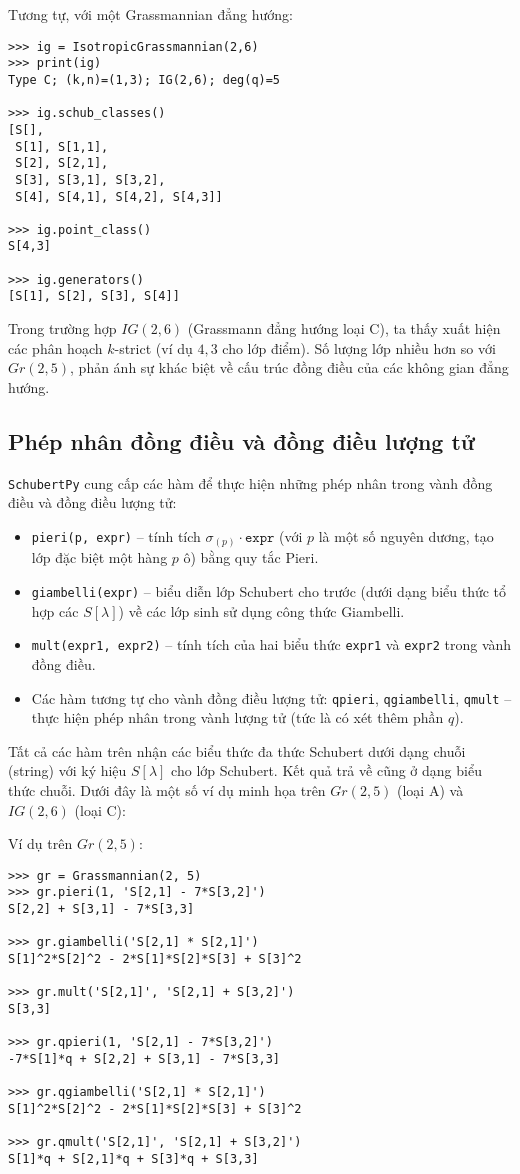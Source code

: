 Tương tự, với một Grassmannian đẳng hướng:
\small
\begin{verbatim}
>>> ig = IsotropicGrassmannian(2,6)
>>> print(ig)
Type C; (k,n)=(1,3); IG(2,6); deg(q)=5

>>> ig.schub_classes()
[S[],
 S[1], S[1,1],
 S[2], S[2,1],
 S[3], S[3,1], S[3,2],
 S[4], S[4,1], S[4,2], S[4,3]]

>>> ig.point_class()
S[4,3]

>>> ig.generators()
[S[1], S[2], S[3], S[4]]
\end{verbatim}
\normalsize

Trong trường hợp $IG(2,6)$ (Grassmann đẳng hướng loại C), ta thấy xuất hiện các phân hoạch $k$-strict (ví dụ $4,3$ cho lớp điểm). Số lượng lớp nhiều hơn so với $Gr(2,5)$, phản ánh sự khác biệt về cấu trúc đồng điều của các không gian đẳng hướng.

\subsection{Phép nhân đồng điều và đồng điều lượng tử}
\texttt{SchubertPy} cung cấp các hàm để thực hiện những phép nhân trong vành đồng điều và đồng điều lượng tử:
\begin{itemize}
    \item \texttt{pieri(p, expr)} – tính tích $\sigma_{(p)} \cdot \texttt{expr}$ (với $p$ là một số nguyên dương, tạo lớp đặc biệt một hàng $p$ ô) bằng quy tắc Pieri.
    \item \texttt{giambelli(expr)} – biểu diễn lớp Schubert cho trước (dưới dạng biểu thức tổ hợp các $S[\lambda]$) về các lớp sinh sử dụng công thức Giambelli.
    \item \texttt{mult(expr1, expr2)} – tính tích của hai biểu thức \texttt{expr1} và \texttt{expr2} trong vành đồng điều.
    \item Các hàm tương tự cho vành đồng điều lượng tử: \texttt{qpieri}, \texttt{qgiambelli}, \texttt{qmult} – thực hiện phép nhân trong vành lượng tử (tức là có xét thêm phần $q$).
\end{itemize}

Tất cả các hàm trên nhận các biểu thức đa thức Schubert dưới dạng chuỗi (string) với ký hiệu $S[\lambda]$ cho lớp Schubert. Kết quả trả về cũng ở dạng biểu thức chuỗi. Dưới đây là một số ví dụ minh họa trên $Gr(2,5)$ (loại A) và $IG(2,6)$ (loại C):

Ví dụ trên $Gr(2,5)$:
\small
\begin{verbatim}
>>> gr = Grassmannian(2, 5)
>>> gr.pieri(1, 'S[2,1] - 7*S[3,2]')
S[2,2] + S[3,1] - 7*S[3,3]

>>> gr.giambelli('S[2,1] * S[2,1]')
S[1]^2*S[2]^2 - 2*S[1]*S[2]*S[3] + S[3]^2

>>> gr.mult('S[2,1]', 'S[2,1] + S[3,2]')
S[3,3]

>>> gr.qpieri(1, 'S[2,1] - 7*S[3,2]')
-7*S[1]*q + S[2,2] + S[3,1] - 7*S[3,3]

>>> gr.qgiambelli('S[2,1] * S[2,1]')
S[1]^2*S[2]^2 - 2*S[1]*S[2]*S[3] + S[3]^2

>>> gr.qmult('S[2,1]', 'S[2,1] + S[3,2]')
S[1]*q + S[2,1]*q + S[3]*q + S[3,3]
\end{verbatim}
\normalsize

